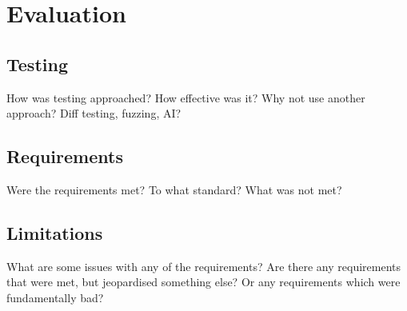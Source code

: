 \chapter{Evaluation}

\section{Testing}
How was testing approached?
How effective was it?
Why not use another approach? Diff testing, fuzzing, AI?

\section{Requirements}
Were the requirements met?
To what standard?
What was not met?

\section{Limitations}
What are some issues with any of the requirements?
Are there any requirements that were met, but jeopardised something else? 
Or any requirements which were fundamentally bad?